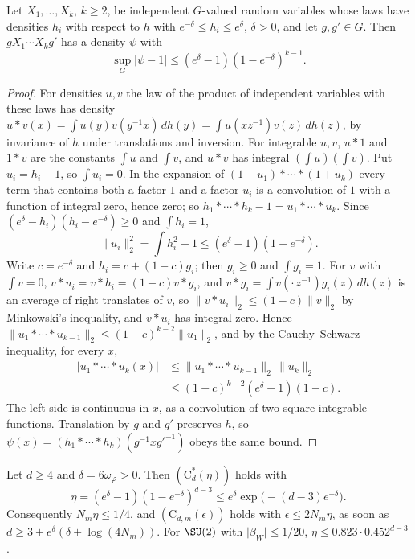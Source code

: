 \begin{lemma}\label{rC12:convolution}
Let $X_1,\dots,X_k$, $k\ge2$, be independent $G$-valued random variables
whose laws have densities $h_i$ with respect to $h$ with $e^{-\delta}\le h_i
\le e^\delta$, $\delta>0$, and let $g,g'\in G$. Then $gX_1\cdots X_kg'$ has
a density $\psi$ with
\[
\sup_G\lvert\psi-1\rvert\le(e^\delta-1)(1-e^{-\delta})^{k-1}.
\]
\end{lemma}

\begin{proof}
For densities $u,v$ the law of the product of independent variables with
these laws has density $u*v(x)=\int u(y)v(y^{-1}x)\,dh(y)=\int u(xz^{-1})
v(z)\,dh(z)$, by invariance of $h$ under translations and inversion. For
integrable $u,v$, $u*1$ and $1*v$ are the constants $\int u$ and $\int v$,
and $u*v$ has integral $(\int u)(\int v)$. Put $u_i=h_i-1$, so $\int u_i=0$.
In the expansion of $(1+u_1)*\cdots*(1+u_k)$ every term that contains both
a factor $1$ and a factor $u_i$ is a convolution of $1$ with a function of
integral zero, hence zero; so $h_1*\cdots*h_k-1=u_1*\cdots*u_k$. Since
$(e^\delta-h_i)(h_i-e^{-\delta})\ge0$ and $\int h_i=1$,
\[
\lVert u_i\rVert_2^2=\int h_i^2-1\le(e^\delta-1)(1-e^{-\delta}).
\]
Write $c=e^{-\delta}$ and $h_i=c+(1-c)g_i$; then $g_i\ge0$ and $\int g_i=1$.
For $v$ with $\int v=0$, $v*u_i=v*h_i=(1-c)v*g_i$, and $v*g_i=\int
v(\cdot\,z^{-1})g_i(z)\,dh(z)$ is an average of right translates of $v$, so
$\lVert v*u_i\rVert_2\le(1-c)\lVert v\rVert_2$ by Minkowski's inequality,
and $v*u_i$ has integral zero. Hence $\lVert u_1*\cdots*u_{k-1}\rVert_2\le
(1-c)^{k-2}\lVert u_1\rVert_2$, and by the Cauchy--Schwarz inequality, for
every $x$,
\[
\begin{split}
\lvert u_1*\cdots*u_k(x)\rvert&\le\lVert u_1*\cdots*u_{k-1}\rVert_2\,\lVert
u_k\rVert_2\\
&\le(1-c)^{k-2}(e^\delta-1)(1-c).
\end{split}
\]
The left side is continuous in $x$, as a convolution of two square
integrable functions. Translation by $g$ and $g'$ preserves $h$, so
$\psi(x)=(h_1*\cdots*h_k)(g^{-1}xg'^{-1})$ obeys the same bound.
\end{proof}

\begin{theorem}\label{rC12:segment}
Let $d\ge4$ and $\delta=6\omega_\varphi>0$. Then $(\mathrm C^*_d(\eta))$
holds with
\[
\eta=(e^\delta-1)(1-e^{-\delta})^{d-3}\le e^\delta\exp\bigl(-(d-3)
e^{-\delta}\bigr).
\]
Consequently $N_m\eta\le1/4$, and $(\mathrm C_{d,m}(\epsilon))$ holds with
$\epsilon\le2N_m\eta$, as soon as $d\ge3+e^\delta(\delta+\log(4N_m))$. For
$\SU(2)$ with $\lvert\beta_W\rvert\le1/20$, $\eta\le0.823\cdot0.452^{d-3}$.
\end{theorem}

